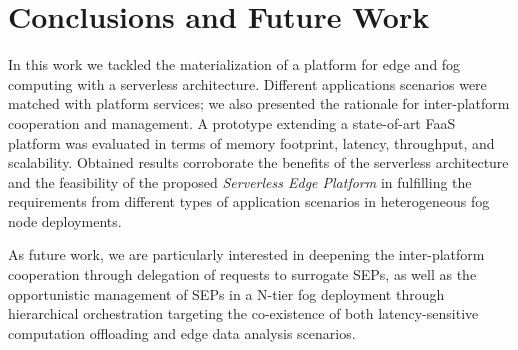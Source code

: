 \section{Conclusions and Future Work}\label{sec:conclusions}

In this work we tackled the materialization of a platform for edge and fog computing with a serverless architecture. Different applications scenarios were matched with platform services; we also presented the rationale for inter-platform cooperation and management. A prototype extending a state-of-art FaaS platform was evaluated in terms of memory footprint, latency, throughput, and scalability. Obtained results corroborate the benefits of the serverless architecture and the feasibility of the proposed \textit{Serverless Edge Platform} in fulfilling the requirements from different types of application scenarios in heterogeneous fog node deployments.

As future work, we are particularly interested in deepening the inter-platform cooperation through delegation of requests to surrogate SEPs, as well as the opportunistic management of SEPs in a N-tier fog deployment through hierarchical orchestration targeting the co-existence of both latency-sensitive computation offloading and edge data analysis scenarios. 